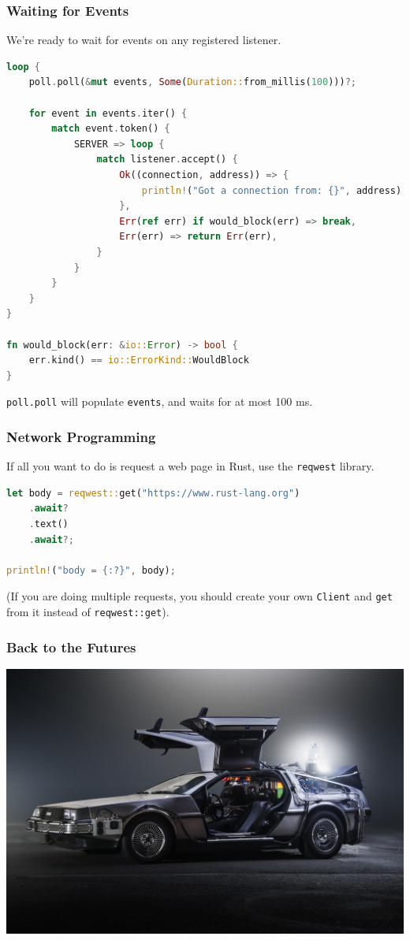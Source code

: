 \begin{frame}[fragile]
\frametitle{Waiting for Events}

We're ready to wait for events on any registered listener.
    \begin{lstlisting}[language=Rust]
loop {
    poll.poll(&mut events, Some(Duration::from_millis(100)))?;

    for event in events.iter() {
        match event.token() {
            SERVER => loop {
                match listener.accept() {
                    Ok((connection, address)) => {
                        println!("Got a connection from: {}", address);
                    },
                    Err(ref err) if would_block(err) => break,
                    Err(err) => return Err(err),
                }
            }
        }
    }
}

fn would_block(err: &io::Error) -> bool {
    err.kind() == io::ErrorKind::WouldBlock
}    \end{lstlisting}

\texttt{poll.poll} will populate \texttt{events}, and
waits for at most 100 ms.

\end{frame}


\begin{frame}[fragile]
\frametitle{Network Programming}
If all you want to do is request a web page in Rust, use
the \texttt{reqwest} library.

\begin{lstlisting}[language=Rust]
let body = reqwest::get("https://www.rust-lang.org")
    .await?
    .text()
    .await?;

println!("body = {:?}", body);
\end{lstlisting}

(If you are doing multiple requests,
you should create your own \texttt{Client} and \texttt{get} from it instead of
\texttt{reqwest::get}).

\end{frame}


\begin{frame}
\frametitle{Back to the Futures}

\begin{center}
	\includegraphics[width=\textwidth]{images/bttf.jpg}
\end{center}

\end{frame}

